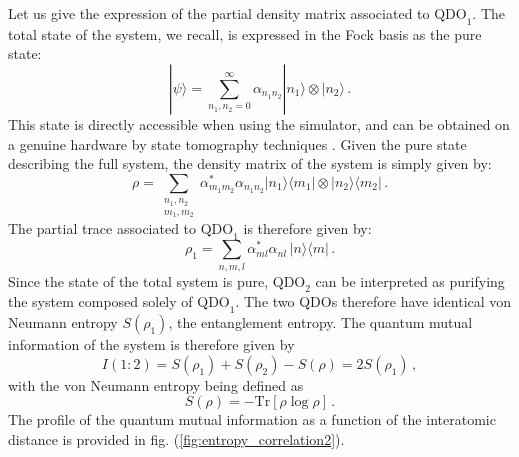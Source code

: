 \documentclass[reprint, amsmath, amssymb, floatfix, aps, pra]{revtex4-2}
\begin{document}
    Let us give the expression of the partial density matrix associated to $\text{QDO}_1$. The total state of the system, we recall, is expressed in the Fock basis as the pure state:
    \begin{equation*}
        |\psi\rangle = \sum_{n_1,n_{2}=0}^\infty \alpha_{n_1n_2}|n_1\rangle\otimes|n_2\rangle\,.
    \end{equation*}
    This state is directly accessible when using the simulator, and can be obtained on a genuine hardware by state tomography techniques \cite{Lvovsky:2009zz}. Given the pure state describing the full system, the density matrix of the system is simply given by:
    \begin{equation*}
        \rho = \sum_{\substack{n_1,n_2 \\ m_1,m_2}} \alpha^*_{m_1m_2}\alpha_{n_1n_2}|n_1\rangle\langle m_1|\otimes|n_2\rangle\langle m_2|\,.
    \end{equation*}
    The partial trace associated to $\text{QDO}_1$ is therefore given by:
    \begin{equation*}
        \rho_1 = \sum_{n, m, l} \alpha^*_{ml}\alpha_{nl}\,|n\rangle\langle m|\,.
    \end{equation*}
    Since the state of the total system is pure, $\text{QDO}_2$ can be interpreted as purifying the system composed solely of $\text{QDO}_1$. The two QDOs therefore have identical von Neumann entropy $S(\rho_1)$, the entanglement entropy. The quantum mutual information of the system is therefore given by
    \begin{equation*}
        I(1:2) = S(\rho_1) + S(\rho_2) - S(\rho) = 2S(\rho_1) \,,
    \end{equation*}
    with the von Neumann entropy being defined as
    \begin{equation*}
        S(\rho) = -\text{Tr}\left[\rho\log\rho\right]\,.
    \end{equation*}
    The profile of the quantum mutual information as a function of the interatomic distance is provided in fig. (\ref{fig:entropy_correlation2}).
\end{document}
